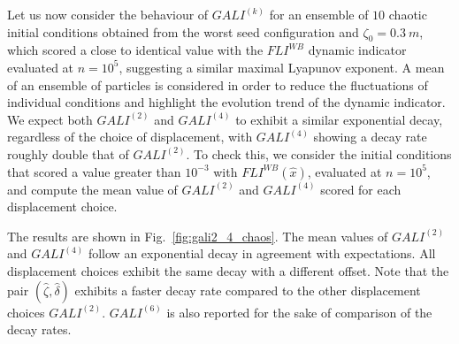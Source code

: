 Let us now consider the behaviour of $GALI^{(k)}$ for an ensemble of $10$ chaotic initial conditions obtained from the worst seed configuration and $\zeta_0=\SI{0.3}{m}$, which scored a close to identical value with the $FLI^{WB}$ dynamic indicator evaluated at $n=10^5$, suggesting a similar maximal Lyapunov exponent. A mean of an ensemble of particles is considered in order to reduce the fluctuations of individual conditions and highlight the evolution trend of the dynamic indicator. We expect both $GALI^{(2)}$ and $GALI^{(4)}$ to exhibit a similar exponential decay, regardless of the choice of displacement, with $GALI^{(4)}$ showing a decay rate roughly double that of $GALI^{(2)}$. To check this, we consider the initial conditions that scored a value greater than $10^{-3}$ with $FLI^{WB}(\hat{x})$, evaluated at $n=10^{5}$, and compute the mean value of $GALI^{(2)}$ and $GALI^{(4)}$ scored for each displacement choice.

The results are shown in Fig.~\ref{fig:gali2_4_chaos}. The mean values of $GALI^{(2)}$ and $GALI^{(4)}$ follow an exponential decay in agreement with expectations. All displacement choices exhibit the same decay with a different offset. Note that the pair $(\hat{\zeta}, \hat{\delta})$ exhibits a faster decay rate compared to the other displacement choices $GALI^{(2)}$. $GALI^{(6)}$ is also reported for the sake of comparison of the decay rates.

